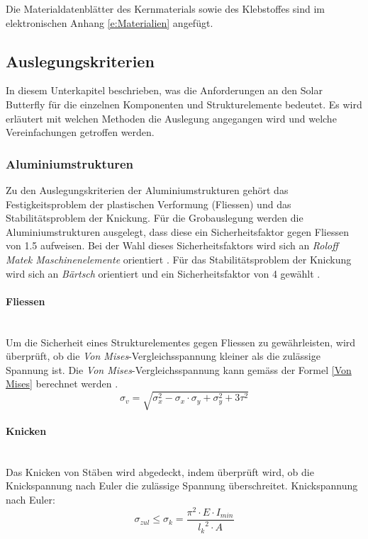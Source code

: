 Die Materialdatenblätter des Kernmaterials sowie des Klebstoffes sind im elektronischen Anhang \ref{e:Materialien} angefügt.
\newpage

\subsection{Auslegungskriterien}
In diesem Unterkapitel beschrieben, was die Anforderungen an den Solar Butterfly für die einzelnen Komponenten und Strukturelemente bedeutet. Es wird erläutert mit welchen Methoden die Auslegung angegangen wird und welche Vereinfachungen getroffen werden.

  \subsubsection{Aluminiumstrukturen}
  Zu den Auslegungskriterien der Aluminiumstrukturen gehört das Festigkeitsproblem der plastischen Verformung (Fliessen) und das Stabilitätsproblem der Knickung. Für die Grobauslegung werden die Aluminiumstrukturen ausgelegt, dass diese ein Sicherheitsfaktor gegen Fliessen von 1.5 aufweisen. Bei der Wahl dieses Sicherheitsfaktors wird sich an \emph{Roloff Matek Maschinenelemente} orientiert \cite{Roloff}. Für das Stabilitätsproblem der Knickung wird sich an \emph{Bärtsch} orientiert und ein Sicherheitsfaktor von 4 gewählt \cite{Baertsch}.

  \paragraph{Fliessen}\mbox{}\\
  Um die Sicherheit eines Strukturelementes gegen Fliessen zu gewährleisten, wird überprüft, ob die \emph{Von Mises}-Vergleichsspannung kleiner als die zulässige Spannung ist. Die \emph{Von Mises}-Vergleichsspannung kann gemäss der Formel \ref{Von Mises} berechnet werden \cite{Baertsch}.
  \begin{equation}
    \label{Von Mises}
    \sigma_v = \sqrt{\sigma_x^{2}-\sigma_x \cdot \sigma_y + \sigma_y^2 + 3\tau^2}
  \end{equation}

  \paragraph{Knicken}\mbox{}\\
  Das Knicken von Stäben wird abgedeckt, indem überprüft wird, ob die Knickspannung nach Euler die zulässige Spannung überschreitet. Knickspannung nach Euler:
  \begin{equation}
    \sigma_{zul} \leq \sigma_k = \frac{\pi^2 \cdot E \cdot I_{min}}{{l_k}^2 \cdot A}
  \end{equation}

